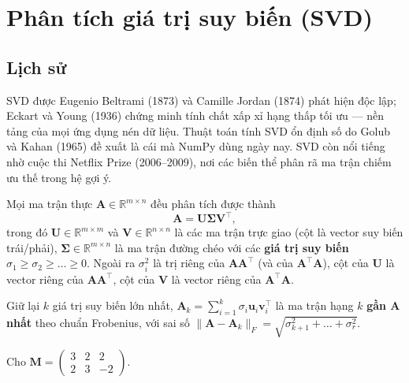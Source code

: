 \section{Phân tích giá trị suy biến (SVD)}

\subsection{Lịch sử}
SVD được Eugenio Beltrami (1873) và Camille Jordan (1874) phát hiện độc lập; Eckart và Young (1936) chứng minh tính chất xấp xỉ hạng thấp tối ưu --- nền tảng của mọi ứng dụng nén dữ liệu. Thuật toán tính SVD ổn định số do Golub và Kahan (1965) đề xuất là cái mà NumPy dùng ngày nay. SVD còn nổi tiếng nhờ cuộc thi Netflix Prize (2006--2009), nơi các biến thể phân rã ma trận chiếm ưu thế trong hệ gợi ý.

\begin{theorem}
Mọi ma trận thực $\mathbf{A} \in \mathbb{R}^{m \times n}$ đều phân tích được thành
\begin{equation}
    \mathbf{A} = \mathbf{U} \boldsymbol{\Sigma} \mathbf{V}^{\top},
\end{equation}
trong đó $\mathbf{U} \in \mathbb{R}^{m \times m}$ và $\mathbf{V} \in \mathbb{R}^{n \times n}$ là các ma trận trực giao (cột là vector suy biến trái/phải), $\boldsymbol{\Sigma} \in \mathbb{R}^{m \times n}$ là ma trận đường chéo với các \textbf{giá trị suy biến} $\sigma_1 \geq \sigma_2 \geq \dots \geq 0$. Ngoài ra $\sigma_i^2$ là trị riêng của $\mathbf{A}\mathbf{A}^{\top}$ (và của $\mathbf{A}^{\top}\mathbf{A}$), cột của $\mathbf{U}$ là vector riêng của $\mathbf{A}\mathbf{A}^{\top}$, cột của $\mathbf{V}$ là vector riêng của $\mathbf{A}^{\top}\mathbf{A}$.
\end{theorem}

\begin{theorem}
Giữ lại $k$ giá trị suy biến lớn nhất, $\mathbf{A}_k = \sum_{i=1}^{k} \sigma_i \mathbf{u}_i \mathbf{v}_i^{\top}$ là ma trận hạng $k$ \textbf{gần $\mathbf{A}$ nhất} theo chuẩn Frobenius, với sai số $\|\mathbf{A} - \mathbf{A}_k\|_F = \sqrt{\sigma_{k+1}^2 + \dots + \sigma_r^2}$.
\end{theorem}

\begin{example}
Cho $\mathbf{M} = \begin{pmatrix} 3 & 2 & 2 \\ 2 & 3 & -2 \end{pmatrix}$.
\end{example}

